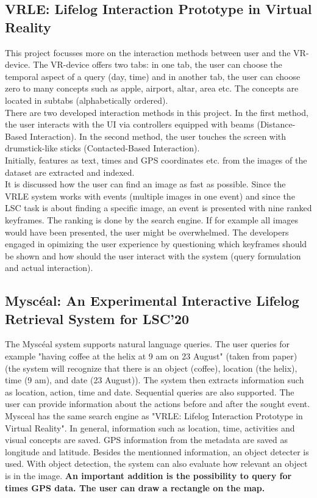 \subsection{VRLE: Lifelog Interaction Prototype in Virtual Reality}
This project focusses more on the interaction methods between user and the VR-device. The VR-device offers two tabs: in one tab, the user can choose the temporal aspect of a query (day, time) and in another tab, the user can choose zero to many concepts such as apple, airport, altar, area etc. The concepts are located in subtabs (alphabetically ordered).\\
There are two developed interaction methods in this project. In the first method, the user interacts with the UI via controllers equipped with beams (Distance-Based Interaction). In the second method, the user touches the screen with drumstick-like sticks (Contacted-Based Interaction).\\
Initially, features as text, times and GPS coordinates etc. from the images of the dataset are extracted and indexed. \\
It is discussed how the user can find an image as fast as possible. Since the VRLE system works with events (multiple images in one event) and since the LSC task is about finding a specific image, an event is presented with nine ranked keyframes. The ranking is done by the search engine. If for example all images would have been presented, the user might be overwhelmed. The developers engaged in opimizing the user experience by questioning which keyframes should be shown and how should the user interact with the system (query formulation and actual interaction).

\subsection{Myscéal: An Experimental Interactive Lifelog Retrieval System for LSC’20}
The Myscéal system supports natural language queries. The user queries for example "having coffee at the helix at 9 am on 23 August" (taken from paper)(the system will recognize that there is an object (coffee), location (the helix), time (9 am), and date (23 August)). The system then extracts information such as location, action, time and date. Sequential queries are also supported. The user can provide information about the actions before and after the sought event. Mysceal has the same search engine as "VRLE: Lifelog Interaction Prototype in Virtual Reality". In general, information such as location, time, activities and visual concepts are saved. GPS information from the metadata are saved as longitude and latitude. Besides the mentionned information, an object detecter is used. With object detection, the system can also evaluate how relevant an object is in the image. \textbf{An important addition is the possibility to query for times GPS data. The user can draw a rectangle on the map.}\\

